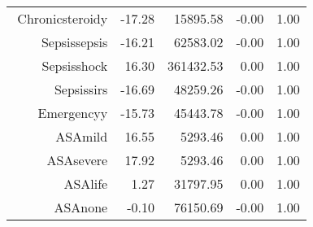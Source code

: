 \begin{tabular}{rrrrr}
$$  Chronic\-steroid\-y & -17.28 & 15895.58 & -0.00 & 1.00 \\ 
  Sepsis\-sepsis & -16.21 & 62583.02 & -0.00 & 1.00 \\ 
  Sepsis\-shock & 16.30 & 361432.53 & 0.00 & 1.00 \\ 
  Sepsis\-sirs & -16.69 & 48259.26 & -0.00 & 1.00 \\ 
  Emergency\-y & -15.73 & 45443.78 & -0.00 & 1.00 \\ 
  ASA\-mild & 16.55 & 5293.46 & 0.00 & 1.00 \\ 
  ASA\-severe & 17.92 & 5293.46 & 0.00 & 1.00 \\ 
  ASA\-life & 1.27 & 31797.95 & 0.00 & 1.00 \\ 
  ASA\-none & -0.10 & 76150.69 & -0.00 & 1.00 \\ 
   \hline
\end{tabular}


